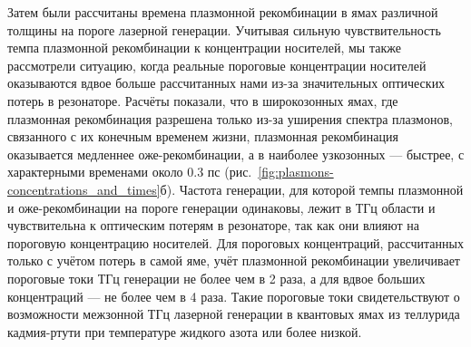 Затем были рассчитаны времена плазмонной рекомбинации в ямах различной толщины на пороге лазерной генерации. Учитывая сильную чувствительность темпа плазмонной рекомбинации к концентрации носителей, мы также рассмотрели ситуацию, когда реальные пороговые концентрации носителей оказываются вдвое больше рассчитанных нами из-за значительных оптических потерь в резонаторе. Расчёты показали, что в широкозонных ямах, где плазмонная рекомбинация разрешена только из-за уширения спектра плазмонов, связанного с их конечным временем жизни, плазмонная рекомбинация оказывается медленнее оже-рекомбинации, а в наиболее узкозонных --- быстрее, с характерными временами около 0.3 пс (рис.~\ref{fig:plasmons-concentrations_and_times}б). Частота генерации, для которой темпы плазмонной и оже-рекомбинации на пороге генерации одинаковы, лежит в ТГц области и чувствительна к оптическим потерям в резонаторе, так как они влияют на пороговую концентрацию носителей. Для пороговых концентраций, рассчитанных только с учётом потерь в самой яме, учёт плазмонной рекомбинации увеличивает пороговые токи ТГц генерации не более чем в 2 раза, а для вдвое больших концентраций --- не более чем в 4 раза. Такие пороговые токи свидетельствуют о возможности межзонной ТГц лазерной генерации в квантовых ямах из теллурида кадмия-ртути при температуре жидкого азота или более низкой.